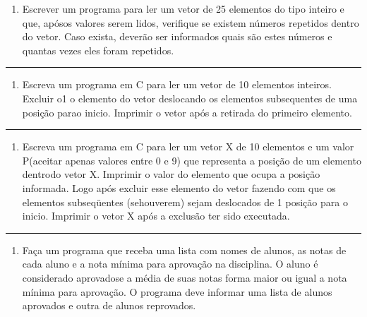 \documentclass[12pt,a4paper]{article}
\renewcommand{\linethickness}{0.05em}
\providecommand{\tightlist}{%
      \setlength{\itemsep}{0pt}\setlength{\parskip}{0pt}}
\begin{document}
\begin{enumerate}
\def\labelenumi{\arabic{enumi}.}
\setcounter{enumi}{17}
\tightlist
\item
  Escrever um programa para ler um vetor de 25 elementos do tipo inteiro
  e que, apósos valores serem lidos, verifique se existem números
  repetidos dentro do vetor. Caso exista, deverão ser informados quais
  são estes números e quantas vezes eles foram repetidos.
\end{enumerate}

    \begin{center}\rule{0.5\linewidth}{\linethickness}\end{center}

\begin{enumerate}
\def\labelenumi{\arabic{enumi}.}
\setcounter{enumi}{18}
\tightlist
\item
  Escreva um programa em C para ler um vetor de 10 elementos inteiros.
  Excluir o1 o elemento do vetor deslocando os elementos subsequentes de
  uma posição parao inicio. Imprimir o vetor após a retirada do primeiro
  elemento.
\end{enumerate}

    \begin{center}\rule{0.5\linewidth}{\linethickness}\end{center}

\begin{enumerate}
\def\labelenumi{\arabic{enumi}.}
\setcounter{enumi}{19}
\tightlist
\item
  Escreva um programa em C para ler um vetor X de 10 elementos e um
  valor P(aceitar apenas valores entre 0 e 9) que representa a posição
  de um elemento dentrodo vetor X. Imprimir o valor do elemento que
  ocupa a posição informada. Logo após excluir esse elemento do vetor
  fazendo com que os elementos subseqüentes (sehouverem) sejam
  deslocados de 1 posição para o inicio. Imprimir o vetor X após a
  exclusão ter sido executada.
\end{enumerate}

    \begin{center}\rule{0.5\linewidth}{\linethickness}\end{center}

\begin{enumerate}
\def\labelenumi{\arabic{enumi}.}
\setcounter{enumi}{20}
\tightlist
\item
  Faça um programa que receba uma lista com nomes de alunos, as notas de
  cada aluno e a nota mínima para aprovação na disciplina. O aluno é
  considerado aprovadose a média de suas notas forma maior ou igual a
  nota mínima para aprovação. O programa deve informar uma lista de
  alunos aprovados e outra de alunos reprovados.
\end{enumerate}
\end{document}
